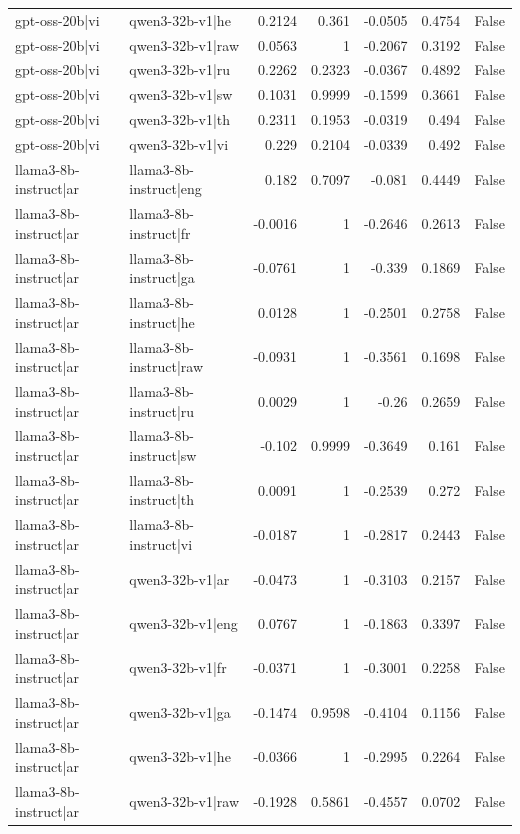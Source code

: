 \begin{table}
\begin{tabular}{l l r r r r l}
gpt-oss-20b|vi & qwen3-32b-v1|he & 0.2124 & 0.361 & -0.0505 & 0.4754 & False \\
gpt-oss-20b|vi & qwen3-32b-v1|raw & 0.0563 & 1 & -0.2067 & 0.3192 & False \\
gpt-oss-20b|vi & qwen3-32b-v1|ru & 0.2262 & 0.2323 & -0.0367 & 0.4892 & False \\
gpt-oss-20b|vi & qwen3-32b-v1|sw & 0.1031 & 0.9999 & -0.1599 & 0.3661 & False \\
gpt-oss-20b|vi & qwen3-32b-v1|th & 0.2311 & 0.1953 & -0.0319 & 0.494 & False \\
gpt-oss-20b|vi & qwen3-32b-v1|vi & 0.229 & 0.2104 & -0.0339 & 0.492 & False \\
llama3-8b-instruct|ar & llama3-8b-instruct|eng & 0.182 & 0.7097 & -0.081 & 0.4449 & False \\
llama3-8b-instruct|ar & llama3-8b-instruct|fr & -0.0016 & 1 & -0.2646 & 0.2613 & False \\
llama3-8b-instruct|ar & llama3-8b-instruct|ga & -0.0761 & 1 & -0.339 & 0.1869 & False \\
llama3-8b-instruct|ar & llama3-8b-instruct|he & 0.0128 & 1 & -0.2501 & 0.2758 & False \\
llama3-8b-instruct|ar & llama3-8b-instruct|raw & -0.0931 & 1 & -0.3561 & 0.1698 & False \\
llama3-8b-instruct|ar & llama3-8b-instruct|ru & 0.0029 & 1 & -0.26 & 0.2659 & False \\
llama3-8b-instruct|ar & llama3-8b-instruct|sw & -0.102 & 0.9999 & -0.3649 & 0.161 & False \\
llama3-8b-instruct|ar & llama3-8b-instruct|th & 0.0091 & 1 & -0.2539 & 0.272 & False \\
llama3-8b-instruct|ar & llama3-8b-instruct|vi & -0.0187 & 1 & -0.2817 & 0.2443 & False \\
llama3-8b-instruct|ar & qwen3-32b-v1|ar & -0.0473 & 1 & -0.3103 & 0.2157 & False \\
llama3-8b-instruct|ar & qwen3-32b-v1|eng & 0.0767 & 1 & -0.1863 & 0.3397 & False \\
llama3-8b-instruct|ar & qwen3-32b-v1|fr & -0.0371 & 1 & -0.3001 & 0.2258 & False \\
llama3-8b-instruct|ar & qwen3-32b-v1|ga & -0.1474 & 0.9598 & -0.4104 & 0.1156 & False \\
llama3-8b-instruct|ar & qwen3-32b-v1|he & -0.0366 & 1 & -0.2995 & 0.2264 & False \\
llama3-8b-instruct|ar & qwen3-32b-v1|raw & -0.1928 & 0.5861 & -0.4557 & 0.0702 & False \\

\end{tabular}
\end{table}
